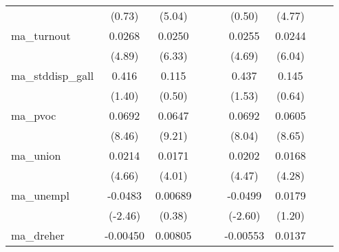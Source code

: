 {\begin{tabular}{l*{8}{c}}
            &      (0.73)         &      (5.04)         &                     &                     &      (0.50)         &      (4.77)         &                     &                     \\
[1em]
ma\_turnout  &      0.0268\sym{***}&      0.0250\sym{***}&                     &                     &      0.0255\sym{***}&      0.0244\sym{***}&                     &                     \\
            &      (4.89)         &      (6.33)         &                     &                     &      (4.69)         &      (6.04)         &                     &                     \\
[1em]
ma\_stddisp\_gall&       0.416         &       0.115         &                     &                     &       0.437         &       0.145         &                     &                     \\
            &      (1.40)         &      (0.50)         &                     &                     &      (1.53)         &      (0.64)         &                     &                     \\
[1em]
ma\_pvoc     &      0.0692\sym{***}&      0.0647\sym{***}&                     &                     &      0.0692\sym{***}&      0.0605\sym{***}&                     &                     \\
            &      (8.46)         &      (9.21)         &                     &                     &      (8.04)         &      (8.65)         &                     &                     \\
[1em]
ma\_union    &      0.0214\sym{***}&      0.0171\sym{***}&                     &                     &      0.0202\sym{***}&      0.0168\sym{***}&                     &                     \\
            &      (4.66)         &      (4.01)         &                     &                     &      (4.47)         &      (4.28)         &                     &                     \\
[1em]
ma\_unempl   &     -0.0483\sym{*}  &     0.00689         &                     &                     &     -0.0499\sym{**} &      0.0179         &                     &                     \\
            &     (-2.46)         &      (0.38)         &                     &                     &     (-2.60)         &      (1.20)         &                     &                     \\
[1em]
ma\_dreher   &    -0.00450         &     0.00805         &                     &                     &    -0.00553         &      0.0137\sym{**} &                     &                     \\

\end{tabular}}

